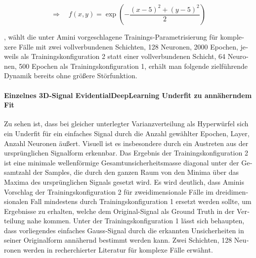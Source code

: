 \begin{otherlanguage}{ngerman}
\[
\Rightarrow \quad f(x, y) = \exp\left( -\frac{(x - 5)^2 + (y - 5)^2}{2} \right)
\]

, wählt die unter Amini vorgeschlagene Trainings-Parametrisierung für komplexere Fälle mit zwei vollverbundenen Schichten, 128 Neuronen, 2000 Epochen, jeweils als Trainingskonfiguration 2 statt einer vollverbundenen Schicht, 64 Neuronen, 500 Epochen als Trainingskonfiguration 1, erhält man folgende zielführende Dynamik bereits ohne größere Störfunktion. 



\paragraph{Einzelnes 3D-Signal \gls{EvidentialDeepLearning} Underfit zu annäherndem Fit} Zu sehen ist, dass bei gleicher unterlegter Varianzverteilung als Hyperwürfel sich ein Underfit für ein einfaches Signal durch die Anzahl gewählter Epochen, Layer, Anzahl Neuronen äußert. Visuell ist es insbesondere durch ein Austreten aus der ursprünglichen Signalform erkennbar. Das Ergebnis der Trainingskonfiguration 2 ist eine minimale wellenförmige Gesamtunsicherheitsmasse diagonal unter der Gesamtzahl der Samples, die durch den ganzen Raum von den Minima über das Maxima des ursprünglichen Signals gesetzt wird. Es wird deutlich, dass Aminis Vorschlag der Trainingskonfiguration 2 für zweidimensionale Fälle im dreidimensionalen Fall mindestens durch Trainingskonfiguration 1 ersetzt werden sollte, um Ergebnisse zu erhalten, welche dem Original-Signal als Ground Truth in der Verteilung nahe kommen. Unter der Trainingskonfiguration 1 lässt sich behaupten, dass vorliegendes einfaches Gauss-Signal durch die erkannten Unsicherheiten in seiner Originalform annähernd bestimmt werden kann. Zwei Schichten, 128 Neuronen werden in recherchierter Literatur für komplexe Fälle erwähnt. %



\end{otherlanguage}

